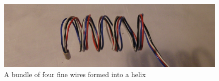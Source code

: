 %

\begin{figure}[!h]
  \centering
  \includegraphics[width=1.1\textwidth]{fig8.jpg}
  \caption{A bundle of four fine wires formed into a helix}
  \label{fig:8}
\end{figure}

%

